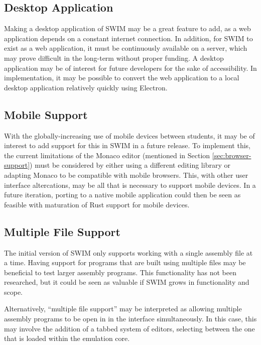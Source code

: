 \documentclass[
    paper=letter,
    parskip=half,
    fontsize=12pt,
    titlepage=firstiscover,
    toc=bibliography,
    numbers=endperiod
]{scrartcl}
\begin{document}

\subsection{Desktop Application}

Making a desktop application of SWIM may be a great feature to add, as a
web application depends on a constant internet connection. In addition,
for SWIM to exist as a web application, it must be continuously
available on a server, which may prove difficult in the long-term
without proper funding. A desktop application may be of interest for
future developers for the sake of accessibility. In implementation, it
may be possible to convert the web application to a local desktop
application relatively quickly using Electron.

\subsection{Mobile Support}

With the globally-increasing use of mobile devices between students, it
may be of interest to add support for this in SWIM in a future release.
To implement this, the current limitations of the Monaco editor
(mentioned in Section \ref{sec:browser-support}) must be considered by
either using a different editing library or adapting Monaco to be
compatible with mobile browsers. This, with other user interface
altercations, may be all that is necessary to support mobile devices. In
a future iteration, porting to a native mobile application could then be
seen as feasible with maturation of Rust support for mobile devices.

\subsection{Multiple File Support}

The initial version of SWIM only supports working with a single assembly
file at a time. Having support for programs that are built using
multiple files may be beneficial to test larger assembly programs. This
functionality has not been researched, but it could be seen as valuable
if SWIM grows in functionality and scope.

Alternatively, ``multiple file support'' may be interpreted as allowing
multiple assembly programs to be open in in the interface
simultaneously. In this case, this may involve the addition of a tabbed
system of editors, selecting between the one that is loaded within the
emulation core.
\end{document}
